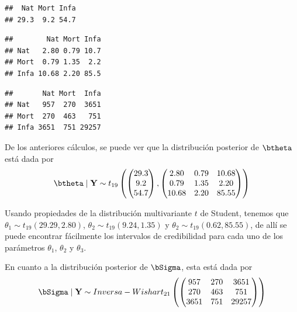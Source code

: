 \begin{Eje}
\begin{knitrout}
\begin{kframe}
\begin{alltt}
 \hlkwb{<-} \hlopt{/}\hlopt{+}\hlopt{*}\hlopt{+}\hlopt{-}\hlopt{+}\hlstd{))}
\end{alltt}
\begin{verbatim}
##  Nat Mort Infa 
## 29.3  9.2 54.7
\end{verbatim}
\begin{alltt}
\end{alltt}
\begin{verbatim}
##        Nat Mort Infa
## Nat   2.80 0.79 10.7
## Mort  0.79 1.35  2.2
## Infa 10.68 2.20 85.5
\end{verbatim}
\begin{alltt}
\end{alltt}
\begin{verbatim}
##       Nat Mort  Infa
## Nat   957  270  3651
## Mort  270  463   751
## Infa 3651  751 29257
\end{verbatim}
\end{kframe}
\end{knitrout}

De los anteriores cálculos, se puede ver que la distribución posterior de $\btheta$ está dada por
\begin{equation*}
\btheta\mid\mathbf{Y}\sim t_{19}\left(\begin{pmatrix}29.3\\9.2\\54.7\end{pmatrix}, \begin{pmatrix}2.80&0.79&10.68\\0.79&1.35&2.20\\10.68&2.20&85.55\end{pmatrix}\right)
\end{equation*}

Usando propiedades de la distribución multivariante $t$ de Student, tenemos que $\theta_1\sim t_{19}(29.29, 2.80)$, $\theta_2\sim t_{19}(9.24, 1.35)$ y $\theta_2\sim t_{19}(0.62, 85.55)$, de allí se puede encontrar fácilmente los intervalos de credibilidad para cada uno de los parámetros $\theta_1$, $\theta_2$ y $\theta_3$.

En cuanto a la distribución posterior de $\bSigma$, esta está dada por
\begin{equation*}
\bSigma\mid\mathbf{Y}\sim Inversa-Wishart_{21}\left(\begin{pmatrix}957&270&3651\\ 270&463&751\\ 3651&751&29257\end{pmatrix}\right)
\end{equation*}


\end{Eje}
